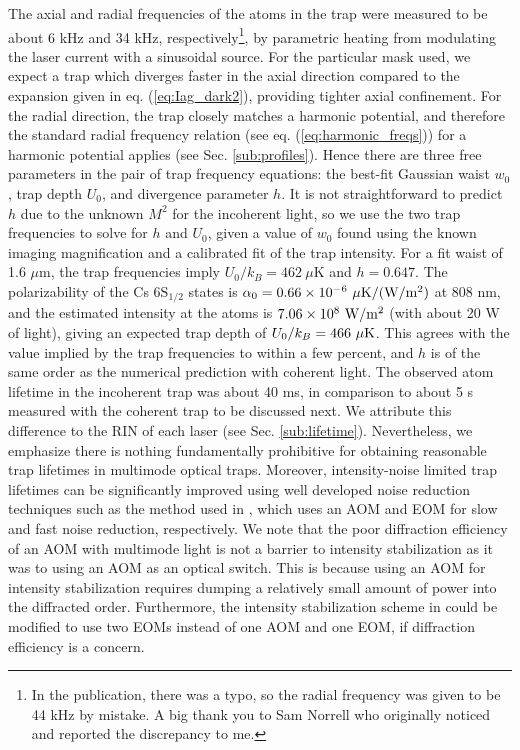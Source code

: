 The axial and radial frequencies of the atoms in the trap were measured to be about 6 kHz and 34 kHz, respectively\footnote{In the publication, there was a typo, so the radial frequency was given to be 44 kHz by mistake. A big thank you to Sam Norrell who originally noticed and reported the discrepancy to me.}, by parametric heating from modulating the laser current with a sinusoidal source. For the particular mask used, we expect a trap which diverges faster in the axial direction compared to the expansion given in eq. (\ref{eq:Iag_dark2}), providing tighter axial confinement. For the radial direction, the trap closely matches a harmonic potential, and therefore the standard radial frequency relation (see eq. (\ref{eq:harmonic_freqs})) for a harmonic potential applies (see Sec. \ref{sub:profiles}). Hence there are three free parameters in the pair of trap frequency equations: the best-fit Gaussian waist $w_0$, trap depth $U_0$, and divergence parameter $h$. It is not straightforward to predict $h$ due to the unknown $M^2$ for the incoherent light, so we use the two trap frequencies to solve for $h$ and $U_0$, given a value of $w_0$ found using the known imaging magnification and a calibrated fit of the trap intensity. For a fit waist of 1.6 $\mu \mathrm{m}$, the trap frequencies imply $U_0/k_B=462 ~\mu$K and $h=0.647$. The polarizability of the Cs $6\text{S}_{1/2}$ states is
$\alpha_0 = 0.66\times10^{-6} ~\mu\text K/(\text W/\text m^2)$ at 808 nm, and the estimated intensity at the atoms is $7.06 \times 10^8~\text W/ \text m^2$ (with about 20 W of light), giving an expected trap depth of $U_0/k_B=466 ~\mu \text K$. This agrees with the value implied by the trap frequencies to within a few percent, and $h$ is of the same order as the numerical prediction with coherent light. 
The observed atom lifetime in the incoherent trap was about 40 ms, in comparison to about 5 s measured with the coherent trap to be discussed next. We attribute this difference to the RIN of each laser (see Sec. \ref{sub:lifetime}). Nevertheless, we emphasize there is nothing fundamentally prohibitive for obtaining reasonable trap lifetimes in  multimode optical traps\cite{WHung2015,Povilus2005}. Moreover, intensity-noise limited trap lifetimes can be significantly improved  using well developed noise reduction techniques such as the method used in \cite{YuWang2020}, which uses an AOM and EOM for slow and fast noise reduction, respectively. We note that the poor diffraction efficiency of an AOM with multimode light is not a barrier to intensity stabilization as it was to using an AOM as an optical switch. This is because using an AOM for intensity stabilization requires dumping a relatively small amount of power into the diffracted order. Furthermore, the intensity stabilization scheme in \cite{YuWang2020} could be modified to use two EOMs instead of one AOM and one EOM, if diffraction efficiency is a concern. 


